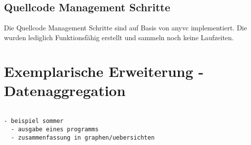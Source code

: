 \subsection{Quellcode Management Schritte}

Die Quellcode Management Schritte sind auf Basis von anyvc \cite{anyvc:website} implementiert. Die wurden lediglich Funktionsfähig erstellt und sammeln noch keine Laufzeiten.

\section{Exemplarische Erweiterung - Datenaggregation}

 
\begin{verbatim}

- beispiel sommer
  - ausgabe eines programms
  - zusammenfassung in graphen/uebersichten

\end{verbatim}

